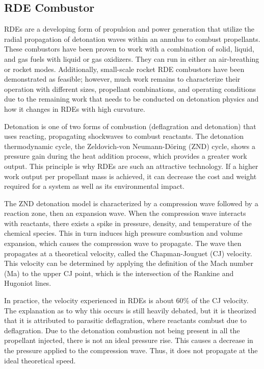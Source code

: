 \subsection{RDE Combustor}

RDEs are a developing form of propulsion and power generation that utilize the radial propagation of detonation waves within an annulus to combust propellants. These combustors have been proven to work with a combination of solid, liquid, and gas fuels with liquid or gas oxidizers. They can run in either an air-breathing or rocket modes. Additionally, small-scale rocket RDE combustors have been demonstrated as feasible; however, much work remains to characterize their operation with different sizes, propellant combinations, and operating conditions due to the remaining work that needs to be conducted on detonation physics and how it changes in RDEs with high curvature.

Detonation is one of two forms of combustion (deflagration and detonation) that uses reacting, propagating shockwaves to combust reactants. The detonation thermodynamic cycle, the Zeldovich-von Neumann-Döring (ZND) cycle, shows a pressure gain during the heat addition process, which provides a greater work output. This principle is why RDEs are such an attractive technology. If a higher work output per propellant mass is achieved, it can decrease the cost and weight required for a system as well as its environmental impact.

The ZND detonation model is characterized by a compression wave followed by a reaction zone, then an expansion wave. When the compression wave interacts with reactants, there exists a spike in pressure, density, and temperature of the chemical species. This in turn induces high pressure combustion and volume expansion, which causes the compression wave to propagate. The wave then propagates at a theoretical velocity, called the Chapman-Jouguet (CJ) velocity. This velocity can be determined by applying the definition of the Mach number (Ma) to the upper CJ point, which is the intersection of the Rankine and Hugoniot lines.

In practice, the velocity experienced in RDEs is about 60\% of the CJ velocity.  The explanation as to why this occurs is still heavily debated, but it is theorized that it is attributed to parasitic deflagration, where reactants combust due to deflagration. Due to the detonation combustion not being present in all the propellant injected, there is not an ideal pressure rise. This causes a decrease in the pressure applied to the compression wave. Thus, it does not propagate at the ideal theoretical speed.

